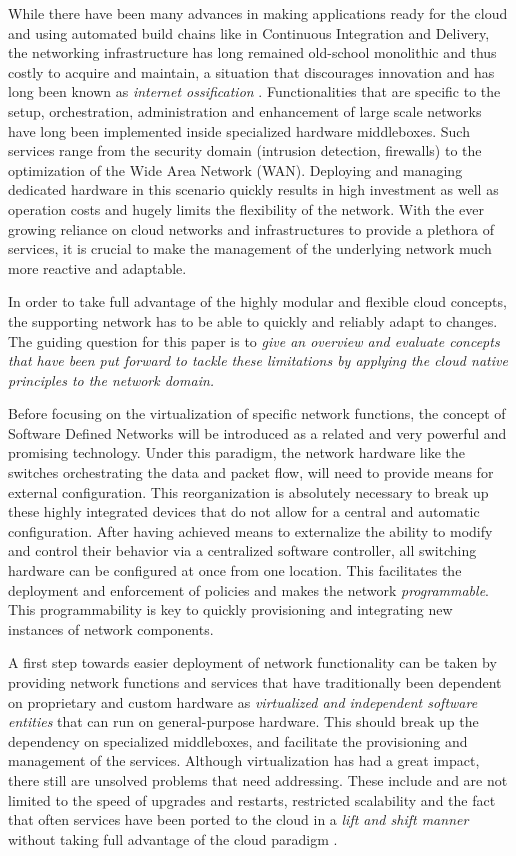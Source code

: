 While there have been many advances in making applications ready for the cloud  and using automated build chains like in Continuous Integration and Delivery, the networking infrastructure has long remained old-school monolithic and thus costly to acquire and maintain, a situation that discourages innovation and has long been known as \textit{internet ossification} \cite{nunes2014survey}. Functionalities that are specific to the setup, orchestration, administration and enhancement of large scale networks have long been implemented inside specialized hardware middleboxes. Such services range from the security domain (intrusion detection, firewalls) to the optimization of the Wide Area Network (WAN). Deploying and managing dedicated hardware in this scenario quickly results in high investment as well as operation costs and hugely limits the flexibility of the network. With the ever growing reliance on cloud networks and infrastructures to provide a plethora of services, it is crucial to make the management of the underlying network much more reactive and adaptable. 

In order to take full advantage of the highly modular and flexible cloud concepts, the supporting network has to be able to quickly and reliably adapt to changes. The guiding question for this paper is to \textit{give an overview and evaluate concepts that have been put forward to tackle these limitations by applying the cloud native principles to the network domain.}

Before focusing on the virtualization of specific network functions, the concept of Software Defined Networks will be introduced as a related and very powerful and promising technology. Under this paradigm, the network hardware like the switches orchestrating the data and packet flow, will need to provide means for external configuration. This reorganization is absolutely necessary to break up these highly integrated devices that do not allow for a central and automatic configuration. After having achieved means to externalize the ability to modify and control their behavior via a centralized software controller, all switching hardware can be configured at once from one location. This facilitates the deployment and enforcement of policies and makes the network \textit{programmable}. This programmability is key to quickly provisioning and integrating new instances of network components. 

A first step towards easier deployment of network functionality can be taken by providing network functions  and services that have traditionally been dependent on proprietary and custom hardware as \textit{virtualized and independent software entities} that can run on general-purpose hardware. This should break up the dependency on specialized middleboxes, and facilitate the provisioning and management of the services. Although virtualization has had a great impact, there still are unsolved problems that need addressing. These include and are not limited to the speed of upgrades and restarts, restricted scalability and the fact that often services have been ported to the cloud in a \textit{lift and shift manner} without taking full advantage of the cloud paradigm \cite{CNF}.

